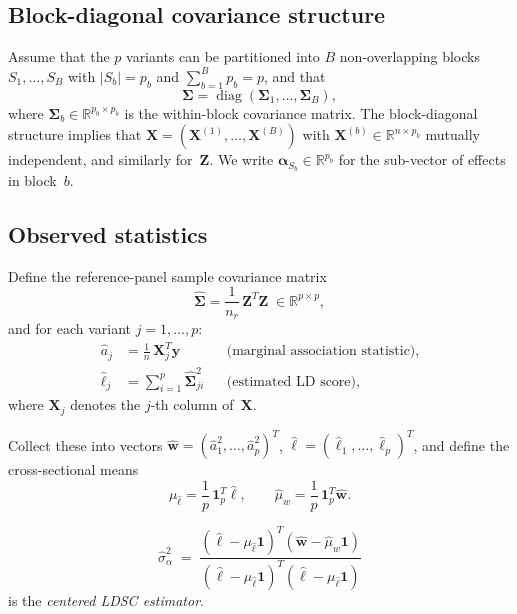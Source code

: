 \documentclass[11pt]{article}
\newcommand{\R}{\mathbb{R}}
\newcommand{\diag}{\operatorname{diag}}
\newcommand{\X}{\bm{X}}
\newcommand{\Z}{\bm{Z}}
\newcommand{\y}{\bm{y}}
\newcommand{\bSig}{\bm{\Sigma}}
\newcommand{\hSig}{\widehat{\bm{\Sigma}}}
\newcommand{\bal}{\bm{\alpha}}
\newcommand{\bone}{\bm{1}}
\begin{document}
\subsection{Block-diagonal covariance structure}\label{ssec:block}

Assume that the $p$ variants can be partitioned into $B$ non-overlapping blocks
$S_1,\dots,S_B$ with $|S_b|=p_b$ and $\sum_{b=1}^{B}p_b=p$, and that
\begin{equation}\label{eq:blockSig}
  \bSig = \diag(\bSig_1,\dots,\bSig_B),
\end{equation}
where $\bSig_b\in\R^{p_b\times p_b}$ is the within-block covariance matrix.
The block-diagonal structure implies that
$\X=(\X^{(1)},\dots,\X^{(B)})$ with $\X^{(b)}\in\R^{n\times p_b}$
mutually independent, and similarly for~$\Z$.  We write
$\bal_{S_b}\in\R^{p_b}$ for the sub-vector of effects in block~$b$.

\subsection{Observed statistics}\label{ssec:stats}

Define the reference-panel sample covariance matrix
\begin{equation}\label{eq:hSig}
  \hSig = \frac{1}{n_r}\,\Z^{T}\Z \;\in\R^{p\times p},
\end{equation}
and for each variant $j=1,\dots,p$:
\begin{align}
  \hat{a}_j &= \frac{1}{n}\,\X_j^{T}\y
    &&\text{(marginal association statistic)}, \label{eq:aj}\\[4pt]
  \hat\ell_j &= \sum_{i=1}^{p}\hSig_{ji}^{2}
    &&\text{(estimated LD score)}, \label{eq:lj}
\end{align}
where $\X_j$ denotes the $j$-th column of~$\X$.

Collect these into vectors
$\hat{\bm{w}}=(\hat{a}_1^{2},\dots,\hat{a}_p^{2})^{T}$,
$\hat{\bm\ell}=(\hat\ell_1,\dots,\hat\ell_p)^{T}$,
and define the cross-sectional means
\[
  \mu_{\hat\ell}=\frac{1}{p}\,\bone_p^{T}\hat{\bm\ell},
  \qquad
  \hat\mu_w=\frac{1}{p}\,\bone_p^{T}\hat{\bm{w}}.
\]

\begin{equation}\label{eq:LDSC}
\boxed{\;
  \hat\sigma_\alpha^2
  \;=\;\frac{(\hat{\bm\ell}-\mu_{\hat\ell}\bone)^{T}
             (\hat{\bm{w}}-\hat\mu_w\bone)}
            {(\hat{\bm\ell}-\mu_{\hat\ell}\bone)^{T}
             (\hat{\bm\ell}-\mu_{\hat\ell}\bone)}
\;}
\end{equation}
is the \emph{centered LDSC estimator}.
\end{document}
